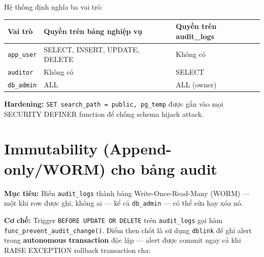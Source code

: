 Hệ thống định nghĩa ba vai trò:

\begin{center}
\centering
{}
\label{tab:rbac}
\begin{tabularx}{\textwidth}{lXX}
\toprule
\textbf{Vai trò} & \textbf{Quyền trên bảng nghiệp vụ} & \textbf{Quyền trên audit\_logs} \\
\midrule
\texttt{app\_user} & SELECT, INSERT, UPDATE, DELETE & Không có \\
\texttt{auditor} & Không có & SELECT \\
\texttt{db\_admin} & ALL & ALL (owner) \\
\bottomrule
\end{tabularx}
\end{center}

\begin{sloppypar}\textbf{Hardening:} \texttt{SET search\_path = public, pg\_temp} được gắn vào mọi SECURITY DEFINER function để chống schema hijack attack.\end{sloppypar}

\section{Immutability (Append-only/WORM) cho bảng audit}
\label{sec:immutability}

\textbf{Mục tiêu:} Biến \texttt{audit\_logs} thành bảng Write-Once-Read-Many (WORM) --- một khi row được ghi, không ai --- kể cả \texttt{db\_admin} --- có thể sửa hay xóa nó.

\begin{sloppypar}\textbf{Cơ chế:} Trigger \texttt{BEFORE UPDATE OR DELETE} trên \texttt{audit\_logs} gọi hàm \texttt{func\_prevent\_\allowbreak{}audit\_change()}. Điểm then chốt là sử dụng \texttt{dblink} để ghi alert trong \textbf{autonomous transaction} độc lập --- alert được commit ngay cả khi RAISE EXCEPTION rollback transaction cha:\end{sloppypar}

